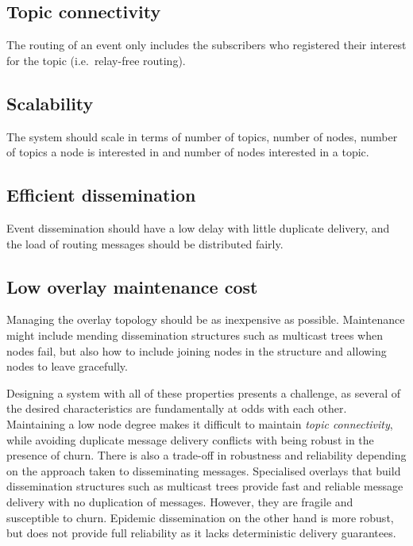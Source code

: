\subsection{Topic connectivity}
The routing of an event only includes the
subscribers who registered their interest for the topic (i.e.\
relay-free routing).

\subsection{Scalability}
The system should scale in terms of number of
topics, number of nodes, number of topics a node is interested in and
number of nodes interested in a topic.

\subsection{Efficient dissemination}
Event dissemination should have a low
delay with little duplicate delivery, and the load of routing messages
should be distributed fairly.

\subsection{Low overlay maintenance cost}
Managing the overlay topology
should be as inexpensive as possible. Maintenance might include mending
dissemination structures such as multicast trees when nodes fail, but
also how to include joining nodes in the structure and allowing nodes to
leave gracefully.

Designing a system with all of these properties
presents a challenge, as several of the desired characteristics are
fundamentally at odds with each other. Maintaining a low node degree
makes it difficult to maintain \emph{topic connectivity}, while
avoiding duplicate message delivery conflicts with being robust in the
presence of churn. There is also a trade-off in robustness and
reliability depending on the approach taken to disseminating messages.
Specialised overlays that build dissemination structures such as
multicast trees provide fast and reliable message delivery with no
duplication of messages. However, they are fragile and susceptible to
churn. Epidemic dissemination on the other hand is more robust, but does
not provide full reliability as it lacks deterministic delivery
guarantees.

